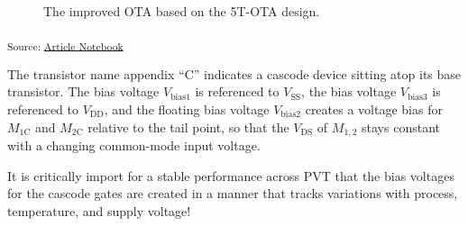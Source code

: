 \documentclass[
  a4paper,
  DIV=11,
  numbers=noendperiod]{scrartcl}
\begin{document}
\begin{figure}[H]


\caption{\label{fig-improved-ota}The improved OTA based on the 5T-OTA
design.}

\end{figure}%

\textsubscript{Source:
\href{https://iic-jku.github.io/analog-circuit-design/index.qmd.html}{Article
Notebook}}

The transistor name appendix ``C'' indicates a cascode device sitting
atop its base transistor. The bias voltage \(V_\mathrm{bias1}\) is
referenced to \(V_\mathrm{SS}\), the bias voltage \(V_\mathrm{bias3}\)
is referenced to \(V_\mathrm{DD}\), and the floating bias voltage
\(V_\mathrm{bias2}\) creates a voltage bias for \(M_\mathrm{1C}\) and
\(M_\mathrm{2C}\) relative to the tail point, so that the
\(V_\mathrm{DS}\) of \(M_{1,2}\) stays constant with a changing
common-mode input voltage.

\begin{tcolorbox}[enhanced jigsaw, titlerule=0mm, left=2mm, coltitle=black, toprule=.15mm, breakable, opacitybacktitle=0.6, colframe=quarto-callout-important-color-frame, bottomtitle=1mm, toptitle=1mm, opacityback=0, colbacktitle=quarto-callout-important-color!10!white, title=\textcolor{quarto-callout-important-color}{\faExclamation}\hspace{0.5em}{Cascode Bias Voltage Generation}, arc=.35mm, rightrule=.15mm, colback=white, bottomrule=.15mm, leftrule=.75mm]

It is critically import for a stable performance across PVT that the
bias voltages for the cascode gates are created in a manner that tracks
variations with process, temperature, and supply voltage!

\end{tcolorbox}
\end{document}
